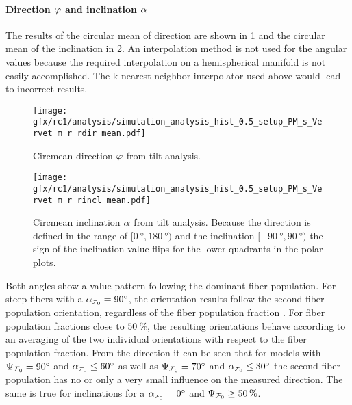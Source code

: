 \paragraph{Direction $\textnormal{$\varphi$}$ and inclination $\textnormal{$\alpha$}$}
%
The results of the circular mean of direction are shown in \cref{fig:sim_ana_dir} and the circular mean of the inclination in \cref{fig:sim_ana_incl}.
An interpolation method is not used for the angular values because the required interpolation on a hemispherical manifold is not easily accomplished.
The k-nearest neighbor interpolator used above would lead to incorrect results.
\par
% 
\begin{figure}[!p]
    \centering
    \texttt{[image: gfx/rc1/analysis/simulation\_analysis\_hist\_0.5\_setup\_PM\_s\_Vervet\_m\_r\_rdir\_mean.pdf]}
    \caption{Circmean direction $\textnormal{$\varphi$}$ from tilt analysis.}
    \label{fig:sim_ana_dir}
\end{figure}
% 
\begin{figure}[!p]
    \centering
    \texttt{[image: gfx/rc1/analysis/simulation\_analysis\_hist\_0.5\_setup\_PM\_s\_Vervet\_m\_r\_rincl\_mean.pdf]}
    \caption{Circmean inclination $\textnormal{$\alpha$}$ from tilt analysis. Because the direction is defined in the range of $[\SI{0}{\degree},\SI{180}{\degree})$ and the inclination $[\SI{-90}{\degree},\SI{90}{\degree})$ the sign of the inclination value flips for the lower quadrants in the polar plots.}
    \label{fig:sim_ana_incl}
\end{figure}
% 
Both angles show a value pattern following the dominant fiber population.
For steep fibers with a $\modelInc = \SI{90}{\degree}$, the orientation results follow the second fiber population orientation, regardless of the fiber population fraction \modelPsi{}.
For fiber population fractions close to $\SI{50}{\percent}$, the resulting orientations behave according to an averaging of the two individual orientations with respect to the fiber population fraction.
From the direction it can be seen that for models with $\textnormal{$\Psi_{\textnormal{$\mathcal{F}_0$}}$} = \SI{90}{\degree}$ and $\modelInc \leq \SI{60}{\degree}$ as well as $\textnormal{$\Psi_{\textnormal{$\mathcal{F}_0$}}$} = \SI{70}{\degree}$ and $\modelInc \leq \SI{30}{\degree}$ the second fiber population has no or only a very small influence on the measured direction.
The same is true for inclinations for a $\modelInc = \SI{0}{\degree}$ and $\textnormal{$\Psi_{\textnormal{$\mathcal{F}_0$}}$} \geq \SI{50}{\percent}$.
% 
% 
% 
